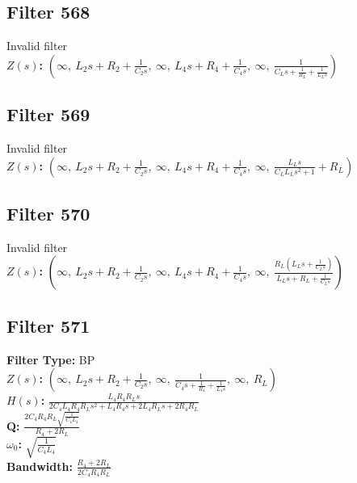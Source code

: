 \documentclass{article}
\begin{document}
\subsection*{Filter 568}
Invalid filter \\ 
\textbf{$Z(s)$:} $\left( \infty, \  L_{2} s + R_{2} + \frac{1}{C_{2} s}, \  \infty, \  L_{4} s + R_{4} + \frac{1}{C_{4} s}, \  \infty, \  \frac{1}{C_{L} s + \frac{1}{R_{L}} + \frac{1}{L_{L} s}}\right)$ \\ 
\subsection*{Filter 569}
Invalid filter \\ 
\textbf{$Z(s)$:} $\left( \infty, \  L_{2} s + R_{2} + \frac{1}{C_{2} s}, \  \infty, \  L_{4} s + R_{4} + \frac{1}{C_{4} s}, \  \infty, \  \frac{L_{L} s}{C_{L} L_{L} s^{2} + 1} + R_{L}\right)$ \\ 
\subsection*{Filter 570}
Invalid filter \\ 
\textbf{$Z(s)$:} $\left( \infty, \  L_{2} s + R_{2} + \frac{1}{C_{2} s}, \  \infty, \  L_{4} s + R_{4} + \frac{1}{C_{4} s}, \  \infty, \  \frac{R_{L} \left(L_{L} s + \frac{1}{C_{L} s}\right)}{L_{L} s + R_{L} + \frac{1}{C_{L} s}}\right)$ \\ 
\subsection*{Filter 571}
\textbf{Filter Type:} BP \\ 
\textbf{$Z(s)$:} $\left( \infty, \  L_{2} s + R_{2} + \frac{1}{C_{2} s}, \  \infty, \  \frac{1}{C_{4} s + \frac{1}{R_{4}} + \frac{1}{L_{4} s}}, \  \infty, \  R_{L}\right)$ \\ 
\textbf{$H(s)$:} $\frac{L_{4} R_{4} R_{L} s}{2 C_{4} L_{4} R_{4} R_{L} s^{2} + L_{4} R_{4} s + 2 L_{4} R_{L} s + 2 R_{4} R_{L}}$ \\ 
\textbf{Q:} $\frac{2 C_{4} R_{4} R_{L} \sqrt{\frac{1}{C_{4} L_{4}}}}{R_{4} + 2 R_{L}}$ \\ 
\textbf{$\omega_0$:} $\sqrt{\frac{1}{C_{4} L_{4}}}$ \\ 
\textbf{Bandwidth:} $\frac{R_{4} + 2 R_{L}}{2 C_{4} R_{4} R_{L}}$ \\ 
\end{document}

